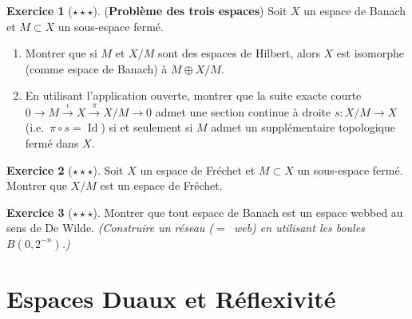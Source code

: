 \documentclass[a4paper,12pt]{book}
\DeclareMathOperator{\Id}{Id}
\theoremstyle{definition}
\newtheorem{exercice}{Exercice}[chapter]
\theoremstyle{plain}
\theoremstyle{remark}
\begin{document}
\begin{exercice}[$\star\star\star$]
\label{exo:trois-espaces}
(\textbf{Problème des trois espaces})
Soit $X$ un espace de Banach et $M \subset X$ un sous-espace fermé.
\begin{enumerate}[label=(\alph*)]
  \item Montrer que si $M$ et $X/M$ sont des espaces de Hilbert, alors $X$
    est isomorphe (comme espace de Banach) à $M \oplus X/M$.
  \item En utilisant l'application ouverte, montrer que la suite exacte courte
    $0 \to M \xrightarrow{\iota} X \xrightarrow{\pi} X/M \to 0$
    admet une section continue à droite $s : X/M \to X$ (i.e.\ $\pi \circ s = \Id$)
    si et seulement si $M$ admet un supplémentaire topologique fermé dans $X$.
\end{enumerate}
\end{exercice}

\begin{exercice}[$\star\star\star$]
\label{exo:frechet-quotient}
Soit $X$ un espace de Fréchet et $M \subset X$ un sous-espace fermé.
Montrer que $X/M$ est un espace de Fréchet.
\end{exercice}

\begin{exercice}[$\star\star\star$]
\label{exo:espaces-webbed}
Montrer que tout espace de Banach est un espace webbed au sens de
De Wilde. \textit{(Construire un réseau ($=$~web) en utilisant les boules
$B(0, 2^{-n})$.)}
\end{exercice}


\chapter{Espaces Duaux et Réflexivité}
\label{chap:dualite-reflexivite}
\minitoc
\end{document}
